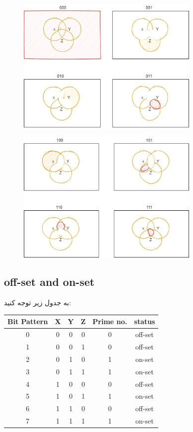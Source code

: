 \documentclass[20pt, a4paper]{article}
\begin{document}
\begin{figure}[htbp]
	\centerline{\includegraphics[width=250pt]{img/venn/solution1.png}}
\end{figure}

\begin{figure}[htbp]
	\centerline{\includegraphics[width=250pt]{img/venn/solution2.png}}
\end{figure}
\newpage

\raggedleft
\justifying
\subsection{off-set and on-set}
به جدول زیر توجه کنید:
\center 
\begin{LTR}
	\begin{tabular}{ c | c c c | c | c }
		Bit Pattern & X & Y & Z & Prime no. & status \\
		\hline
		0 & 0 & 0 & 0 & 0 & off-set \\ 				
		1 & 0 & 0 & 1 & 0 & off-set\\
		2 & 0 & 1 & 0 & 1 & on-set\\
		3 & 0 & 1 & 1 & 1 & on-set\\
		4 & 1 & 0 & 0 & 0 & off-set\\
		5 & 1 & 0 & 1 & 1 & on-set\\
		6 & 1 & 1 & 0 & 0 & off-set\\
		7 & 1 & 1 & 1 & 1 & on-set\\	
	\end{tabular}
\end{LTR}
\hfill \break
\end{document}
